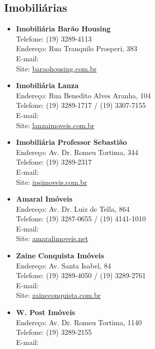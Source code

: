\subsection{Imobiliárias}

\begin{itemize}
\item   \textbf{Imobiliária Barão Housing}
        \\Telefone: (19) 3289-4113
        \\Endereço: Rua Tranquilo Prosperi, 383
        \\E-mail: 
        \\Site: \url{baraohousing.com.br}

\item   \textbf{Imobiliária Lanza}
		\\Endereço: Rua Benedito Alves Aranha, 104
		\\Telefone: (19) 3289-1717 / (19) 3307-7155
		\\E-mail: 
		\\Site: \url{lanzaimoveis.com.br}

\item   \textbf{Imobiliária Professor Sebastião}
		\\Endereço: Av. Dr. Romeu Tortima, 344
		\\Telefone: (19) 3289-2317
		\\E-mail: 
		\\Site: \url{ipsimoveis.com.br}

\item   \textbf{Amaral Imóveis}
		\\Endereço: Av. Dr. Luiz de Tella, 864
		\\Telefone: (19) 3287-0655 / (19) 4141-1010
		\\E-mail: 
		\\Site: \url{amaralimoveis.net}

\item   \textbf{Zaine Conquista Imóveis}
		\\Endereço: Av. Santa Isabel, 84
		\\Telefone: (19) 3289-4050 / (19) 3289-2761
		\\E-mail: 
		\\Site: \url{zaineconquista.com.br}

\item   \textbf{W. Post Imóveis}
		\\Endereço: Av. Dr. Romeu Tortima, 1140
		\\Telefone: (19) 3289-2155
		\\E-mail: 


\end{itemize}
